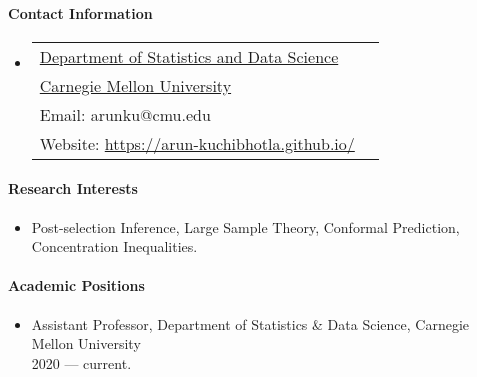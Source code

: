 \documentclass[10pt]{article}
\numberwithin{myalgctr}{section}
\begin{document}
\paragraph{Contact Information}
\begin{itemize}
\item[]
\newlength{\rcollength}\setlength{\rcollength}{1.8in}%
%
\begin{tabular}[t]{@{}p{\textwidth-\rcollength}p{\rcollength}}
\href{http://www.stat.cmu.edu/}%
    {Department of Statistics and Data Science} & \\
\href{https://www.cmu.edu/}{Carnegie Mellon University} &\\
Email: {arunku@cmu.edu} & \\
Website: \url{https://arun-kuchibhotla.github.io/} &
\end{tabular}
\end{itemize}
\paragraph{Research Interests}
\begin{itemize}
    \item[] Post-selection Inference, Large Sample Theory, Conformal Prediction, Concentration Inequalities.
\end{itemize}
\paragraph{Academic Positions}
\begin{itemize}
    \item[] Assistant Professor, Department of Statistics \& Data Science, Carnegie Mellon University \\ 2020 --- current.
\end{itemize}
\end{document}
